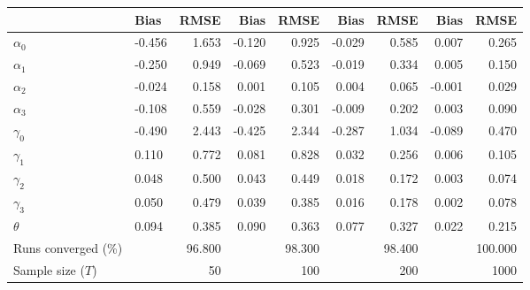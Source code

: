
\begin{tabular}[t]{llrrrrrrr}
\toprule
  & Bias & RMSE & Bias & RMSE & Bias & RMSE & Bias & RMSE\\
\midrule
$\alpha_{0}$ & -0.456 & 1.653 & -0.120 & 0.925 & -0.029 & 0.585 & 0.007 & 0.265\\
$\alpha_{1}$ & -0.250 & 0.949 & -0.069 & 0.523 & -0.019 & 0.334 & 0.005 & 0.150\\
$\alpha_{2}$ & -0.024 & 0.158 & 0.001 & 0.105 & 0.004 & 0.065 & -0.001 & 0.029\\
$\alpha_{3}$ & -0.108 & 0.559 & -0.028 & 0.301 & -0.009 & 0.202 & 0.003 & 0.090\\
$\gamma_{0}$ & -0.490 & 2.443 & -0.425 & 2.344 & -0.287 & 1.034 & -0.089 & 0.470\\
$\gamma_{1}$ & 0.110 & 0.772 & 0.081 & 0.828 & 0.032 & 0.256 & 0.006 & 0.105\\
$\gamma_{2}$ & 0.048 & 0.500 & 0.043 & 0.449 & 0.018 & 0.172 & 0.003 & 0.074\\
$\gamma_{3}$ & 0.050 & 0.479 & 0.039 & 0.385 & 0.016 & 0.178 & 0.002 & 0.078\\
$\theta$ & 0.094 & 0.385 & 0.090 & 0.363 & 0.077 & 0.327 & 0.022 & 0.215\\
Runs converged (\%) &  & 96.800 &  & 98.300 &  & 98.400 &  & 100.000\\
Sample size ($T$) &  & 50 &  & 100 &  & 200 &  & 1000\\
\bottomrule
\end{tabular}
